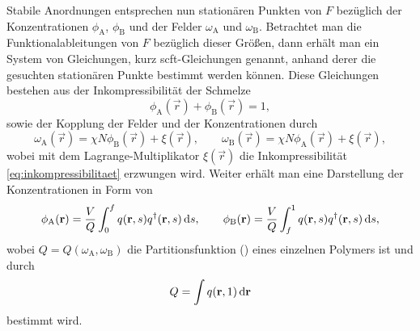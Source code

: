 Stabile Anordnungen entsprechen nun stationären Punkten von $F$ bezüglich der Konzentrationen $\phi_{\mathrm{A}}$, $\phi_{\mathrm{B}}$ und der Felder $\omega_{\mathrm{A}}$ und $\omega_{\mathrm{B}}$.
Betrachtet man die Funktionalableitungen von $F$ bezüglich dieser Größen, dann erhält man ein System von Gleichungen, kurz \ac{scft}-Gleichungen genannt, anhand derer die gesuchten stationären Punkte bestimmt werden können.
Diese Gleichungen bestehen aus der Inkompressibilität der Schmelze
\begin{equation}
\label{eq:inkompressibilitaet}
    \phi_{\mathrm{A}}(\vec{r}) + \phi_{\mathrm{B}}(\vec{r}) = 1,
\end{equation}%
sowie der Kopplung der Felder und der Konzentrationen durch
\begin{equation}
\label{eq:felder}
        \omega_{\mathrm{A}}(\vec{r}) = \chi N \phi_{\mathrm{B}}(\vec{r}) + \xi(\vec{r}), \qquad
        \omega_{\mathrm{B}}(\vec{r}) = \chi N \phi_{\mathrm{A}}(\vec{r}) + \xi(\vec{r}),
\end{equation}%
wobei mit dem Lagrange-Multiplikator $\xi(\vec{r})$ die Inkompressibilität \cref{eq:inkompressibilitaet} erzwungen wird.
Weiter erhält man eine Darstellung der Konzentrationen in Form von
\begin{equation}
\label{eq:konzentrationen}
        \phi_{\mathrm{A}}(\mathbf{r}) = \frac{V}{Q} \int_{0}^{f} q(\mathbf{r}, s) q^{\dagger}(\mathbf{r}, s) \mathop{}\!\mathrm{d} s, \qquad
        \phi_{\mathrm{B}}(\mathbf{r}) = \frac{V}{Q} \int_{f}^{1} q(\mathbf{r}, s) q^{\dagger}(\mathbf{r}, s) \mathop{}\!\mathrm{d} s,
\end{equation}%
wobei $Q = Q(\omega_{\mathrm{A}}, \omega_{\mathrm{B}})$ die Partitionsfunktion () eines einzelnen Polymers ist und durch
\begin{equation}
\label{eq:partitionsfunktion}
    Q = \int q(\mathbf{r}, 1) \mathop{}\!\mathrm{d} \mathbf{r}
\end{equation}%
bestimmt wird.

